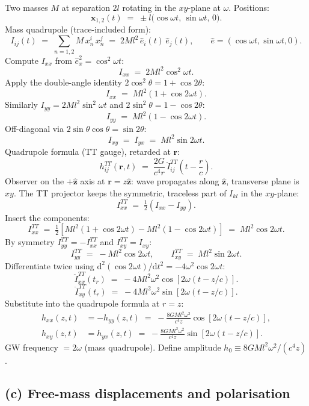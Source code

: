 \documentclass[11pt]{article}
\newcommand{\de}{\mathrm{d}}
\begin{document}
Two masses $M$ at separation $2l$ rotating in the $xy$-plane at $\omega$. Positions:
\[
\bm x_{1,2}(t) \;=\; \pm l\bigl(\cos\omega t,\,\sin\omega t,\,0\bigr).
\]
Mass quadrupole (trace-included form):
\[
I_{ij}(t) \;=\; \sum_{n=1,2} M\,x_n^i\,x_n^j \;=\; 2 M l^2\,\hat e_i(t)\,\hat e_j(t),\qquad \hat e=(\cos\omega t,\sin\omega t,0).
\]
Compute $I_{xx}$ from $\hat e_x^2=\cos^2\omega t$:
\[
I_{xx} \;=\; 2M l^2 \cos^2\omega t.
\]
Apply the double-angle identity $2\cos^2\theta=1+\cos 2\theta$:
\[
I_{xx} \;=\; M l^2(1+\cos 2\omega t).
\]
Similarly $I_{yy}=2M l^2\sin^2\omega t$ and $2\sin^2\theta=1-\cos 2\theta$:
\[
I_{yy} \;=\; M l^2(1-\cos 2\omega t).
\]
Off-diagonal via $2\sin\theta\cos\theta=\sin 2\theta$:
\[
I_{xy} \;=\; I_{yx} \;=\; M l^2 \sin 2\omega t.
\]
Quadrupole formula (TT gauge), retarded at $\bm r$:
\[
h_{ij}^{TT}(\bm r,t) \;=\; \frac{2G}{c^4 r}\,\ddot{I}_{ij}^{TT}\!\left(t-\frac{r}{c}\right).
\]
Observer on the $+\hat{\bm z}$ axis at $\bm r=z\hat{\bm z}$: wave propagates along $\hat{\bm z}$, transverse plane is $xy$. The TT projector keeps the symmetric, traceless part of $I_{kl}$ in the $xy$-plane:
\[
I_{xx}^{TT} \;=\; \tfrac{1}{2}(I_{xx}-I_{yy}).
\]
Insert the components:
\[
I_{xx}^{TT} \;=\; \tfrac{1}{2}[M l^2(1+\cos 2\omega t)-M l^2(1-\cos 2\omega t)] \;=\; M l^2 \cos 2\omega t.
\]
By symmetry $I_{yy}^{TT}=-I_{xx}^{TT}$ and $I_{xy}^{TT}=I_{xy}$:
\[
I_{yy}^{TT} \;=\; -M l^2 \cos 2\omega t,\qquad I_{xy}^{TT} \;=\; M l^2 \sin 2\omega t.
\]
Differentiate twice using $\de^2(\cos 2\omega t)/\de t^2=-4\omega^2\cos 2\omega t$:
\[
\ddot I_{xx}^{TT}(t_r) \;=\; -4 M l^2\omega^2 \cos[2\omega(t-z/c)].
\]
\[
\ddot I_{xy}^{TT}(t_r) \;=\; -4 M l^2\omega^2 \sin[2\omega(t-z/c)].
\]
Substitute into the quadrupole formula at $r=z$:
\begin{equation}
\boxed{\;
\begin{aligned}
h_{xx}(z,t) &= -h_{yy}(z,t) \;=\; -\frac{8 G M l^2\omega^2}{c^4 z}\cos[2\omega(t-z/c)],\\[2pt]
h_{xy}(z,t) &= h_{yx}(z,t) \;=\; -\frac{8 G M l^2\omega^2}{c^4 z}\sin[2\omega(t-z/c)].
\end{aligned}\;}
\label{eq:hcomps}
\end{equation}
GW frequency $=2\omega$ (mass quadrupole). Define amplitude $h_0\equiv 8GMl^2\omega^2/(c^4 z)$.

\subsection*{(c) Free-mass displacements and polarisation}
\end{document}
